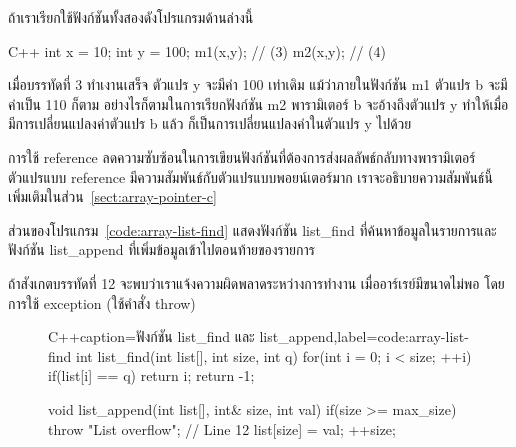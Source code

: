 ถ้า{\wbr}เรา{\wbr}เรียก{\wbr}ใช้{\wbr}ฟังก์ชัน{\wbr}ทั้ง{\wbr}สอง{\wbr}ดัง{\wbr}โปรแกรม{\wbr}ด้าน{\wbr}ล่าง{\wbr}นี้{\wbr}

\latintext
\begin{codelist}{C++}{}
int x = 10;
int y = 100;
m1(x,y);            // (3)
m2(x,y);            // (4)
\end{codelist}
\thaitext

เมื่อ{\wbr}บรรทัด{\wbr}ที่ 3 ทำ{\wbr}เงา{\wbr}น{\wbr}เสร็จ ตัวแปร {\ct y} จะ{\wbr}มี{\wbr}ค่า 100 เท่า{\wbr}เดิม แม้ว่า{\wbr}ภายใน{\wbr}ฟังก์ชัน{\wbr}
{\ct m1} ตัวแปร b จะ{\wbr}มี{\wbr}ค่า{\wbr}เป็น 110 ก็ตาม อย่างไรก็ตาม{\wbr}ใน{\wbr}การ{\wbr}เรียก{\wbr}ฟังก์ชัน {\ct m2}
พารามิเตอร์ {\ct b} จะ{\wbr}อ้าง{\wbr}ถึง{\wbr}ตัวแปร {\ct y} ทำ{\wbr}ให้{\wbr}เมื่อ{\wbr}มี{\wbr}การ{\wbr}เปลี่ยนแปลง{\wbr}ค่าตัวแปร{\wbr}
{\ct b} แล้ว ก็{\wbr}เป็น{\wbr}การ{\wbr}เปลี่ยนแปลง{\wbr}ค่า{\wbr}ใน{\wbr}ตัวแปร {\ct y} ไป{\wbr}ด้วย{\wbr}

การ{\wbr}ใช้ reference ลด{\wbr}ความ{\wbr}ซับซ้อน{\wbr}ใน{\wbr}การ{\wbr}เขียน{\wbr}ฟังก์ชัน{\wbr}ที่{\wbr}ต้องการ{\wbr}ส่ง{\wbr}ผลลัพธ์{\wbr}กลับ{\wbr}ทาง{\wbr}พารามิเตอร์{\wbr}
ตัวแปร{\wbr}แบบ reference มี{\wbr}ความ{\wbr}สัมพันธ์{\wbr}กับ{\wbr}ตัวแปร{\wbr}แบบ{\wbr}พอยน์เตอร์{\wbr}มาก{\wbr}
เรา{\wbr}จะ{\wbr}อธิบาย{\wbr}ความ{\wbr}สัมพันธ์{\wbr}นี้{\wbr}เพิ่มเติม{\wbr}ใน{\wbr}ส่วน~\ref{sect:array-pointer-c}

ส่วน{\wbr}ของ{\wbr}โปรแกรม~\ref{code:array-list-find} แสดง{\wbr}ฟังก์ชัน {\ct list\_find}
ที่{\wbr}ค้นหา{\wbr}ข้อมูล{\wbr}ใน{\wbr}รายการ{\wbr}และ{\wbr}ฟังก์ชัน {\ct list\_append}
ที่{\wbr}เพิ่ม{\wbr}ข้อมูล{\wbr}เข้า{\wbr}ไป{\wbr}ตอน{\wbr}ท้าย{\wbr}ของ{\wbr}รายการ{\wbr}

ถ้า{\wbr}สังเกต{\wbr}บรรทัด{\wbr}ที่ 12 จะ{\wbr}พบ{\wbr}ว่า{\wbr}เรา{\wbr}แจ้งความ{\wbr}ผิดพลาด{\wbr}ระหว่าง{\wbr}การ{\wbr}ทำงาน{\wbr}
เมื่อ{\wbr}อาร์เรย์{\wbr}มี{\wbr}ขนาด{\wbr}ไม่{\wbr}พอ โดย{\wbr}การ{\wbr}ใช้ exception (ใช้{\wbr}คำสั่ง {\ct throw})


\begin{figure}
\latintext
\begin{codelist}{C++}{caption={\thaitext ฟังก์ชัน {\ct list\_find} และ {\ct list\_append}\latintext},label=code:array-list-find}
int list_find(int list[], int size, int q)
{
  for(int i = 0; i < size; ++i)
    if(list[i] == q)
      return i;
  return -1;
}

void list_append(int list[], int& size, int val)
{
  if(size >= max_size)
    throw "List overflow";      // Line 12
  list[size] = val;
  ++size;
}
\end{codelist}
\thaitext
\end{figure}

